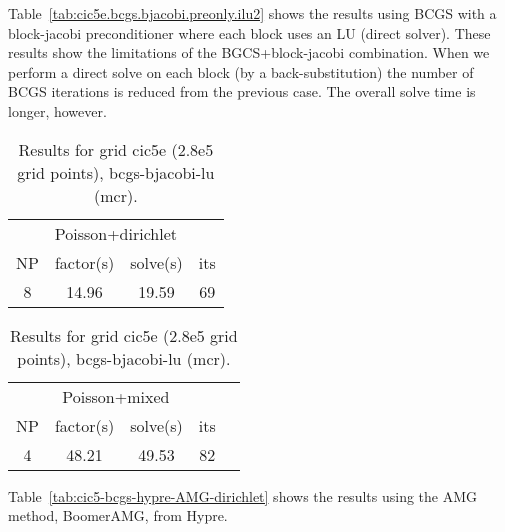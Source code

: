 Table~\ref{tab:cic5e.bcgs.bjacobi.preonly.ilu2}
shows the results using BCGS with a block-jacobi preconditioner where each
block uses an LU (direct solver). These results show the limitations of the 
BGCS+block-jacobi combination. When we perform a direct solve on 
each block (by a back-substitution) the number of BCGS iterations is reduced
from the previous case. The overall solve time is longer, however. 


\begin{table}[hbt]
\begin{center}\footnotesize
\begin{tabular}{|c|c|c|c|} \hline 
\multicolumn{4}{|c|}{Poisson+dirichlet} \\
  NP   & factor(s)  & solve(s) &  its    \\ \hline 
  8   &      14.96  &     19.59 & 69 \\
\hline
\end{tabular}		
\qquad
\begin{tabular}{|c|c|c|c|l|} \hline 
\multicolumn{4}{|c|}{Poisson+mixed} \\
  NP   & factor(s)  & solve(s) &  its    \\ \hline
  4   &      48.21  &     49.53 & 82 \\
\hline
\end{tabular}
\end{center}		
\caption{Results for grid cic5e (2.8e5 grid points), bcgs-bjacobi-lu (mcr).}
 \label{tab:cic5e.bcgs.bjacobi.preonly.lu.mixed} 
\end{table}


Table~\ref{tab:cic5-bcgs-hypre-AMG-dirichlet}
shows the results using the AMG method, BoomerAMG, from Hypre.

